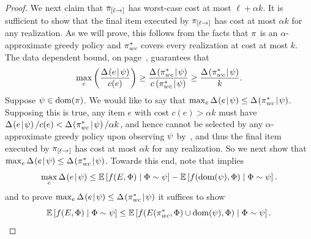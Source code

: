 \begin{proof}
 
 We next claim that $ \pi_{[{\ell}\to]}$ has worst-case cost at most $\ell +
 \alpha k$.  It is sufficient to show that the final item executed by
 $ \pi_{[{\ell}\to]}$ has cost at most $\alpha k$ for any
 realization.
  As we will prove, this follows from the facts that $\pi$ is an
 $\alpha$-approximate greedy policy and $\pi_{wc}^*$ covers
 every realization at cost at most $k$.  
%
%
The data dependent bound,  on page~\pageref{lem:rate-equation-with-costs},
 guarantees that 
 \begin{equation}
   \label{eq:1app-wc}
   \max_e \paren{\frac{\diff{\prlz}{e}}{c(e)}} \ge
 \frac{ \diff{\prlz}{ \policy_{wc}^* } } {\condcost{\prlz}{\policy_{wc}^*}} 
\ge \frac{ \diff{\prlz}{ \policy_{wc}^* }}{k}. 
 \end{equation}
Suppose ${\color{black}{\ensuremath{\psi}}} \in \operatorname{dom}(\pi)$.
We would like to say that $\max_e  \Delta \hspace{-0.3mm} \left( { {e}\! \mid \! {{\color{black}{\ensuremath{\psi}}}} } \right)   \le \Delta \hspace{-0.3mm} \left( { { \pi_{wc}^* }\! \mid \! {{\color{black}{\ensuremath{\psi}}}} } \right)  $.
Supposing this is true, any item $e$ with cost $c(e) > \alpha k$
must have $\Delta \hspace{-0.3mm} \left( { {e}\! \mid \! {{\color{black}{\ensuremath{\psi}}}} } \right)   / c(e) < \Delta \hspace{-0.3mm} \left( { { \pi_{wc}^* }\! \mid \! {{\color{black}{\ensuremath{\psi}}}} } \right)   / \alpha k $, and
hence cannot be selected by any $\alpha$-approximate greedy policy
upon observing ${\color{black}{\ensuremath{\psi}}}$ by~, and thus the
 final item executed by $ \pi_{[{\ell}\to]}$ has cost at most $\alpha k$ for any
 realization.  So we next show that $\max_e  \Delta \hspace{-0.3mm} \left( { {e}\! \mid \! {{\color{black}{\ensuremath{\psi}}}} } \right)   \le \Delta \hspace{-0.3mm} \left( { { \pi_{wc}^* }\! \mid \! {{\color{black}{\ensuremath{\psi}}}} } \right)  $.
%
%
%
%
%
%
%
%
%
%
%
Towards this end, note that  implies 
\begin{equation}
  \label{eq:2b-app-wc}
\max_e  \diff{\prlz}{e} \le \expct{f(\groundset,\rvrlz)   \mid  \rvrlz
  \sim \prlz} - \expct{f(\dom(\prlz),\rvrlz)   \mid  \rvrlz
  \sim \prlz}. 
\end{equation}
and to prove $\max_e  \Delta \hspace{-0.3mm} \left( { {e}\! \mid \! {{\color{black}{\ensuremath{\psi}}}} } \right)   \le \Delta \hspace{-0.3mm} \left( { { \pi_{wc}^* }\! \mid \! {{\color{black}{\ensuremath{\psi}}}} } \right)  $ it suffices to
show 
\begin{equation}
  \label{eq:2c-app-wc}
\expct{f(\groundset,\rvrlz)   \mid  \rvrlz
  \sim \prlz} \le  \expct{f(\played{\policy_{wc}^*}{\rvrlz} \cup \dom(\prlz),\rvrlz)   \mid  \rvrlz
  \sim \prlz}.  
\end{equation}



\end{proof}

